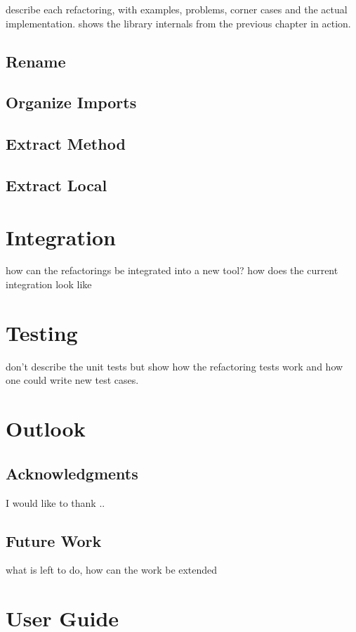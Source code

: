 \documentclass[10pt,a4paper,oneside]{scrreprt}
\begin{document}
describe each refactoring, with examples, problems, corner cases and the actual implementation. shows the library internals from the previous chapter in action.

\section{Rename}
\section{Organize Imports}
\section{Extract Method}
\section{Extract Local}


\chapter{Integration}

how can the refactorings be integrated into a new tool?
how does the current integration look like

\chapter{Testing}

don't describe the unit tests but show how the refactoring tests work and how one could write new test cases.

\chapter{Outlook}

\section{Acknowledgments}

I would like to thank ..

\section{Future Work}

what is left to do, how can the work be extended

\appendix

\chapter{User Guide}
\end{document}
